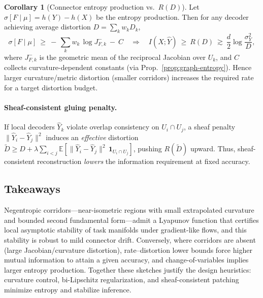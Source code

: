 \documentclass{article}
\theoremstyle{definition}
\newtheorem{corollary}[theorem]{Corollary}
\begin{document}
\begin{corollary}[Connector entropy production vs.\ $R(D)$]
\label{cor:sigma-RD}
Let $\sigma[F\mid \mu]=h(Y)-h(X)$ be the entropy production.
Then for any decoder achieving average distortion $D=\sum_k w_k D_k$,
\[
\sigma[F\mid \mu]\ \ge\ -\,\sum_k w_k\, \log J_{F,k}^{-}\ -\ C
\quad\Longrightarrow\quad
I(X;\widehat Y)\ \ge\ R(D)\ \gtrsim\ \frac{d}{2}\log\!\frac{\sigma_Y^2}{D},
\]
where $J_{F,k}^{-}$ is the geometric mean of the reciprocal Jacobian over $U_k$,
and $C$ collects curvature-dependent constants (via Prop.~\ref{prop:graph-entropy}).
Hence larger curvature/metric distortion (smaller corridors) increases the
required rate for a target distortion budget.
\end{corollary}

\paragraph{Sheaf-consistent gluing penalty.}
If local decoders $\widehat Y_k$ violate overlap consistency on $U_i\cap U_j$,
a sheaf penalty $\|\widehat Y_i-\widehat Y_j\|^2$ induces an \emph{effective}
distortion $\widetilde D \ge D + \lambda \sum_{i<j} \mathbb{E}
[\|\widehat Y_i-\widehat Y_j\|^2\,\mathbf{1}_{U_i\cap U_j}]$, pushing $R(\widetilde D)$
upward. Thus, sheaf-consistent reconstruction \emph{lowers} the information
requirement at fixed accuracy.

\subsection{Takeaways}

Negentropic corridors---near-isometric regions with small extrapolated curvature
and bounded second fundamental form---admit a Lyapunov function that certifies
local asymptotic stability of task manifolds under gradient-like flows, and this
stability is robust to mild connector drift. Conversely, where corridors are
absent (large Jacobian/curvature distortion), rate--distortion lower bounds
force higher mutual information to attain a given accuracy, and change-of-variables
implies larger entropy production. Together these sketches justify the design
heuristics: curvature control, bi-Lipschitz regularization, and sheaf-consistent
patching minimize entropy and stabilize inference.

\newpage


\end{document}
